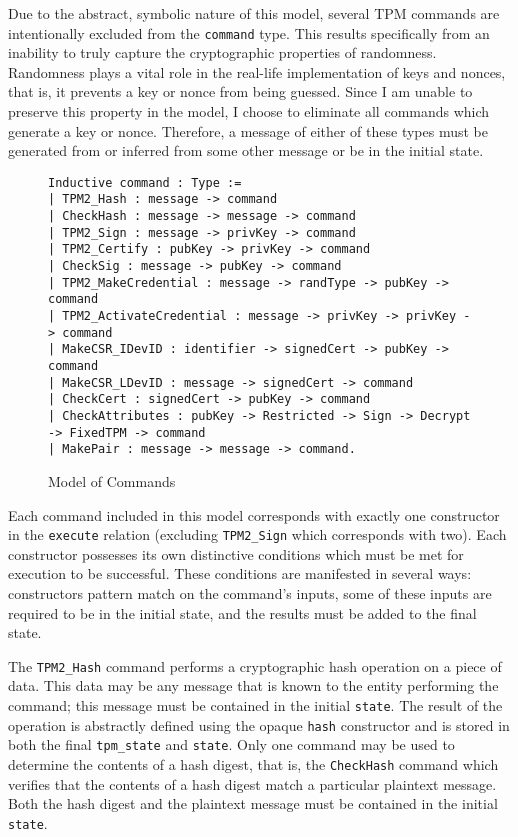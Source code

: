 Due to the abstract, symbolic nature of this model, several TPM commands are intentionally excluded from the \verb|command| type. This results specifically from an inability to truly capture the cryptographic properties of randomness. Randomness plays a vital role in the real-life implementation of keys and nonces, that is, it prevents a key or nonce from being guessed. Since I am unable to preserve this property in the model, I choose to eliminate all commands which generate a key or nonce. Therefore, a message of either of these types must be generated from or inferred from some other message or be in the initial state. 
\begin{figure}[h]
\begin{lstlisting}[language=Coq]
Inductive command : Type :=
| TPM2_Hash : message -> command
| CheckHash : message -> message -> command
| TPM2_Sign : message -> privKey -> command
| TPM2_Certify : pubKey -> privKey -> command
| CheckSig : message -> pubKey -> command
| TPM2_MakeCredential : message -> randType -> pubKey -> command
| TPM2_ActivateCredential : message -> privKey -> privKey -> command
| MakeCSR_IDevID : identifier -> signedCert -> pubKey -> command
| MakeCSR_LDevID : message -> signedCert -> command
| CheckCert : signedCert -> pubKey -> command
| CheckAttributes : pubKey -> Restricted -> Sign -> Decrypt -> FixedTPM -> command
| MakePair : message -> message -> command.
\end{lstlisting}
\caption{Model of Commands}
\end{figure}
Each command included in this model corresponds with exactly one constructor in the \verb|execute| relation (excluding \verb|TPM2_Sign| which corresponds with two). Each constructor possesses its own distinctive conditions which must be met for execution to be successful. These conditions are manifested in several ways: constructors pattern match on the command's inputs, some of these inputs are required to be in the initial state, and the results must be added to the final state. 





The \verb|TPM2_Hash| command performs a cryptographic hash operation on a piece of data. This data may be any message that is known to the entity performing the command; this message must be contained in the initial \verb|state|. The result of the operation is abstractly defined using the opaque \verb|hash| constructor and is stored in both the final \verb|tpm_state| and \verb|state|. Only one command may be used to determine the contents of a hash digest, that is, the \verb|CheckHash| command which verifies that the contents of a hash digest match a particular plaintext message. Both the hash digest and the plaintext message must be contained in the initial \verb|state|.



